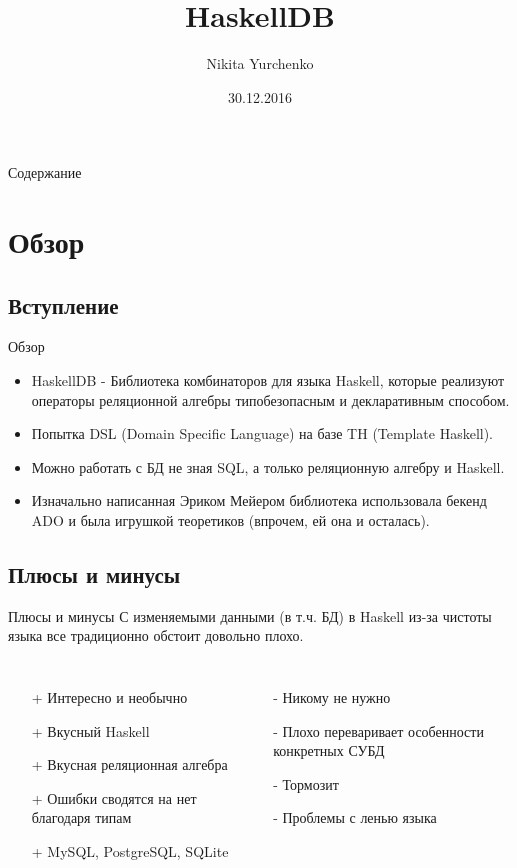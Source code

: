 \documentclass[12pt]{beamer}
\author{Nikita Yurchenko}
\title{HaskellDB}
\institute{National University of Radioelectronics}
\date{30.12.2016}
\begin{document}
\begin{frame}{Содержание}
\titlepage
\end{frame}

\begin{frame}
\tableofcontents
\end{frame}

\section{Обзор}
\subsection{Вступление}
\begin{frame}{Обзор}
\begin{itemize}
\item HaskellDB - Библиотека комбинаторов для языка Haskell, которые реализуют операторы реляционной алгебры типобезопасным и декларативным способом.
\item Попытка DSL (Domain Specific Language) на базе TH (Template Haskell).
\item Можно работать с БД не зная SQL, а только реляционную алгебру и Haskell.
\item Изначально написанная Эриком Мейером библиотека использовала бекенд ADO и была игрушкой теоретиков (впрочем, ей она и осталась).
\end{itemize}
\end{frame}

\subsection{Плюсы и минусы}
\begin{frame}{Плюсы и минусы}
С изменяемыми данными (в т.ч. БД) в Haskell из-за чистоты языка все традиционно обстоит довольно плохо.
\begin{columns}
\begin{itemize}
\item[+] Интересно и необычно
\item[+] Вкусный Haskell
\item[+] Вкусная реляционная алгебра
\item[+] Ошибки сводятся на нет благодаря типам
\item[+] MySQL, PostgreSQL, SQLite
\end{itemize}
\begin{itemize}
\item[-] Никому не нужно
\item[-] Плохо переваривает особенности конкретных СУБД
\item[-] Тормозит
\item[-] Проблемы с ленью языка
\end{itemize}
\end{columns}
\end{frame}
\end{document}

